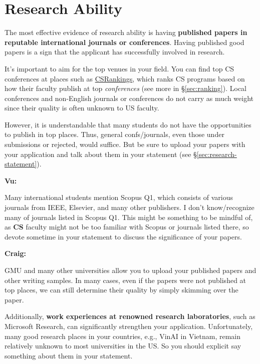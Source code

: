 \documentclass[oneside,11pt]{memoir}
\newenvironment{commentbox}[1][]{
\small
    \begin{mybox}
    {\small \textbf{#1}}
 }{
   \end{mybox}
}
\begin{document}
\section{Research Ability}

The most effective evidence of research ability is having \textbf{published papers in reputable international journals or conferences}.
Having published good papers is a sign that the applicant has successfully involved in research.

It's important to aim for the top venues in your field. You can
find top CS conferences at places such as \href{https://csrankings.org}{CSRankings}, which ranks CS programs based on how their faculty publish at top \emph{conferences} (see more in \S\ref{sec:ranking}). Local conferences and non-English journals or conferences do
not carry as much weight since their quality is often unknown to US faculty.


However, it is understandable that many students do not have the opportunities to publish in top places. Thus, general confs/journals, even those under submissions or rejected, would suffice.  But be sure to upload your papers with your application and talk about them in your statement (see \S\ref{sec:research-statement}).

\begin{commentbox}[Vu:]
Many international students mention Scopus Q1, which consists of various journals from IEEE, Elsevier, and many other publishers.  I don't know/recognize many of journals listed in Scopus Q1. This might be something to be mindful of, as \textbf{CS} faculty might not be too familiar with Scopus or journals listed there, so devote sometime in your statement to discuss the significance of your papers.
\end{commentbox}

\begin{commentbox}[Craig:]
GMU and many other universities allow you to upload your published papers and other writing samples. In many cases, even if the papers were not published at top places, we can still determine their quality by simply skimming over the paper.  
\end{commentbox}

Additionally, \textbf{work experiences at renowned research laboratories}, such as Microsoft Research, can significantly strengthen your
application.  Unfortunately, many good research places in your countries, e.g., VinAI in Vietnam, remain relatively unknown to most universities in the US. So you should explicit say something about them in your statement.
\end{document}
